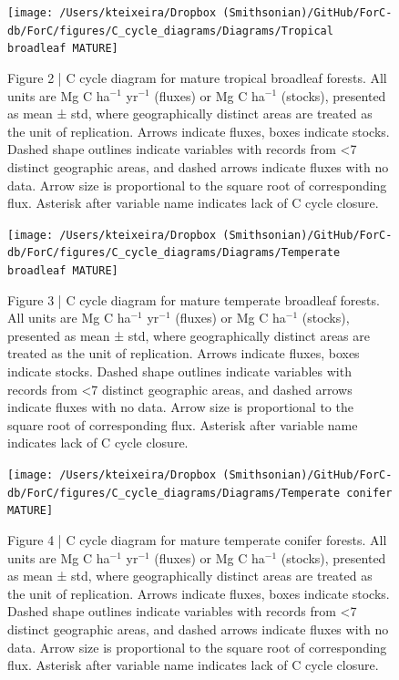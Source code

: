 \documentclass[
]{article}
\begin{document}
\begin{landscape}
\begin{figure}[H]

{\centering \texttt{[image: /Users/kteixeira/Dropbox (Smithsonian)/GitHub/ForC-db/ForC/figures/C\_cycle\_diagrams/Diagrams/Tropical broadleaf MATURE]} 

}

\caption{Figure 2 | C cycle diagram for mature tropical broadleaf forests. All units are Mg C ha$^{-1}$ yr$^{-1}$ (fluxes) or Mg C ha$^{-1}$ (stocks), presented as mean ± std, where geographically distinct areas are treated as the unit of replication.  Arrows indicate fluxes, boxes indicate stocks. Dashed shape outlines indicate variables with records from <7 distinct geographic areas, and dashed arrows indicate fluxes with no data. Arrow size is proportional to the square root of corresponding flux. Asterisk after variable name indicates lack of C cycle closure.}\label{fig:unnamed-chunk-8}
\end{figure}

\begin{figure}[H]

{\centering \texttt{[image: /Users/kteixeira/Dropbox (Smithsonian)/GitHub/ForC-db/ForC/figures/C\_cycle\_diagrams/Diagrams/Temperate broadleaf MATURE]} 

}

\caption{Figure 3 | C cycle diagram for mature temperate broadleaf forests. All units are Mg C ha$^{-1}$ yr$^{-1}$ (fluxes) or Mg C ha$^{-1}$ (stocks), presented as mean ± std, where geographically distinct areas are treated as the unit of replication.  Arrows indicate fluxes, boxes indicate stocks. Dashed shape outlines indicate variables with records from <7 distinct geographic areas, and dashed arrows indicate fluxes with no data. Arrow size is proportional to the square root of corresponding flux. Asterisk after variable name indicates lack of C cycle closure.}\label{fig:unnamed-chunk-9}
\end{figure}

\begin{figure}[H]

{\centering \texttt{[image: /Users/kteixeira/Dropbox (Smithsonian)/GitHub/ForC-db/ForC/figures/C\_cycle\_diagrams/Diagrams/Temperate conifer MATURE]} 

}

\caption{Figure 4 | C cycle diagram for mature temperate conifer forests. All units are Mg C ha$^{-1}$ yr$^{-1}$ (fluxes) or Mg C ha$^{-1}$ (stocks), presented as mean ± std, where geographically distinct areas are treated as the unit of replication.  Arrows indicate fluxes, boxes indicate stocks. Dashed shape outlines indicate variables with records from <7 distinct geographic areas, and dashed arrows indicate fluxes with no data. Arrow size is proportional to the square root of corresponding flux. Asterisk after variable name indicates lack of C cycle closure.}\label{fig:unnamed-chunk-10}
\end{figure}


\end{landscape}
\end{document}
